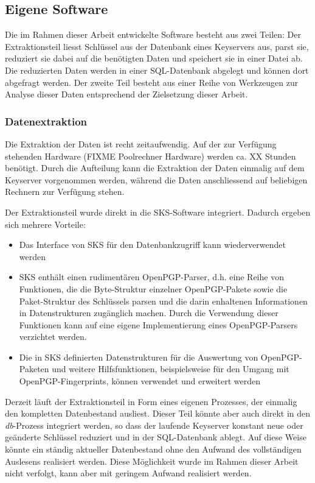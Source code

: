 \subsection{Eigene Software}
\label{ch:Grundlagen:sec:Design:subsec:eigene-software}

Die im Rahmen dieser Arbeit entwickelte Software besteht aus zwei
Teilen: Der Extraktionsteil liesst Schlüssel aus der Datenbank eines
Keyservers aus, parst sie, reduziert sie dabei auf die benötigten
Daten und speichert sie in einer Datei ab. Die reduzierten Daten
werden in einer SQL-Datenbank abgelegt und können dort abgefragt
werden. Der zweite Teil besteht aus einer Reihe von Werkzeugen zur
Analyse dieser Daten entsprechend der Zielsetzung dieser Arbeit.

\subsubsection{Datenextraktion}
\label{sec:datenextraktion}

Die Extraktion der Daten ist recht zeitaufwendig. Auf der zur
Verfügung stehenden Hardware (FIXME Poolrechner Hardware) werden
ca. XX Stunden benötigt. Durch die Aufteilung kann die Extraktion der
Daten einmalig auf dem Keyserver vorgenommen werden, während die Daten
anschliessend auf beliebigen Rechnern zur Verfügung stehen.

Der Extraktionsteil wurde direkt in die SKS-Software
integriert. Dadurch ergeben sich mehrere Vorteile: 

\begin{itemize}
\item Das Interface von SKS für den Datenbankzugriff kann
  wiederverwendet werden
\item SKS enthält einen rudimentären OpenPGP-Parser, d.h. eine Reihe
  von Funktionen, die die Byte-Struktur einzelner OpenPGP-Pakete sowie
  die Paket-Struktur des Schlüssels parsen und die darin enhaltenen
  Informationen in Datenstrukturen zugänglich machen. Durch die
  Verwendung dieser Funktionen kann auf eine eigene Implementierung
  eines OpenPGP-Parsers verzichtet werden.
\item Die in SKS definierten Datenstrukturen für die Auswertung von
  OpenPGP-Paketen und weitere Hilfsfunktionen, beispielsweise für den
  Umgang mit OpenPGP-Fingerprints, können verwendet und erweitert werden
\end{itemize}

Derzeit läuft der Extraktionsteil in Form eines eigenen Prozesses, der
einmalig den kompletten Datenbestand ausliest. Dieser Teil könnte aber
auch direkt in den \emph{db}-Prozess integriert werden, so dass der
laufende Keyserver konstant neue oder geänderte Schlüssel reduziert
und in der SQL-Datenbank ablegt. Auf diese Weise könnte ein ständig
aktueller Datenbestand ohne den Aufwand des vollständigen Auslesens
realisiert werden. Diese Möglichkeit wurde im Rahmen dieser Arbeit
nicht verfolgt, kann aber mit geringem Aufwand realisiert werden.


